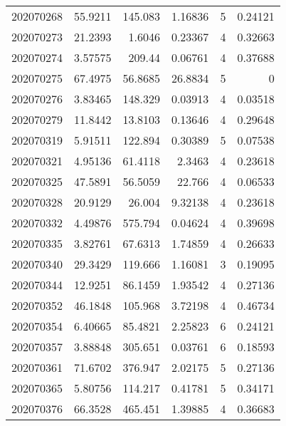 \begin{tabular}{rrrrrr}
 202070268 &         55.9211  &      145.083  &            1.16836 &           5 & 0.24121 \\
 202070273 &         21.2393  &        1.6046 &            0.23367 &           4 & 0.32663 \\
 202070274 &          3.57575 &      209.44   &            0.06761 &           4 & 0.37688 \\
 202070275 &         67.4975  &       56.8685 &           26.8834  &           5 & 0       \\
 202070276 &          3.83465 &      148.329  &            0.03913 &           4 & 0.03518 \\
 202070279 &         11.8442  &       13.8103 &            0.13646 &           4 & 0.29648 \\
 202070319 &          5.91511 &      122.894  &            0.30389 &           5 & 0.07538 \\
 202070321 &          4.95136 &       61.4118 &            2.3463  &           4 & 0.23618 \\
 202070325 &         47.5891  &       56.5059 &           22.766   &           4 & 0.06533 \\
 202070328 &         20.9129  &       26.004  &            9.32138 &           4 & 0.23618 \\
 202070332 &          4.49876 &      575.794  &            0.04624 &           4 & 0.39698 \\
 202070335 &          3.82761 &       67.6313 &            1.74859 &           4 & 0.26633 \\
 202070340 &         29.3429  &      119.666  &            1.16081 &           3 & 0.19095 \\
 202070344 &         12.9251  &       86.1459 &            1.93542 &           4 & 0.27136 \\
 202070352 &         46.1848  &      105.968  &            3.72198 &           4 & 0.46734 \\
 202070354 &          6.40665 &       85.4821 &            2.25823 &           6 & 0.24121 \\
 202070357 &          3.88848 &      305.651  &            0.03761 &           6 & 0.18593 \\
 202070361 &         71.6702  &      376.947  &            2.02175 &           5 & 0.27136 \\
 202070365 &          5.80756 &      114.217  &            0.41781 &           5 & 0.34171 \\
 202070376 &         66.3528  &      465.451  &            1.39885 &           4 & 0.36683 \\

\end{tabular}
